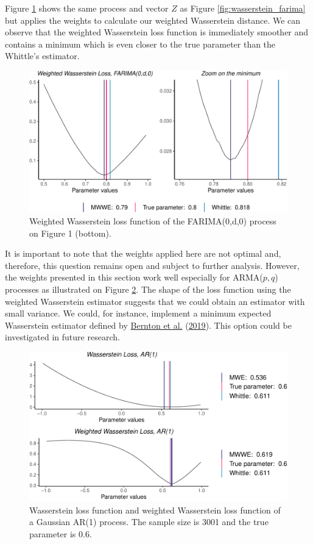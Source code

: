 \documentclass[
  11pt,
]{article}
\begin{document}
Figure \ref{fig:weighted_wasserstein} shows the same process and vector
\(Z\) as Figure \ref{fig:wasserstein_farima} but applies the weights to
calculate our weighted Wasserstein distance. We can observe that the
weighted Wasserstein loss function is immediately smoother and contains
a minimum which is even closer to the true parameter than the Whittle's
estimator.

\begin{figure}

{\centering \includegraphics[width=0.6\linewidth]{Master_thesis_V2_files/figure-latex/weighted_wasserstein-1} 

}

\caption{Weighted Wasserstein loss function of the FARIMA(0,d,0) process on Figure 1 (bottom).}\label{fig:weighted_wasserstein}
\end{figure}

It is important to note that the weights applied here are not optimal
and, therefore, this question remains open and subject to further
analysis. However, the weights presented in this section work well
especially for ARMA(\(p,q\)) processes as illustrated on Figure
\ref{fig:wass_ar1_weighted}. The shape of the loss function using the
weighted Wasserstein estimator suggests that we could obtain an
estimator with small variance. We could, for instance, implement a
minimum expected Wasserstein estimator defined by
\protect\hyperlink{ref-bernton2019parameter}{Bernton et al.}
(\protect\hyperlink{ref-bernton2019parameter}{2019}). This option could
be investigated in future research.

\begin{figure}

{\centering \includegraphics[width=0.55\linewidth]{Master_thesis_V2_files/figure-latex/wass_ar1_weighted-1} 

}

\caption{Wasserstein loss function and weighted Wasserstein loss function of a Gaussian AR(1) process. The sample size is 3001 and the true parameter is 0.6.}\label{fig:wass_ar1_weighted}
\end{figure}
\end{document}

